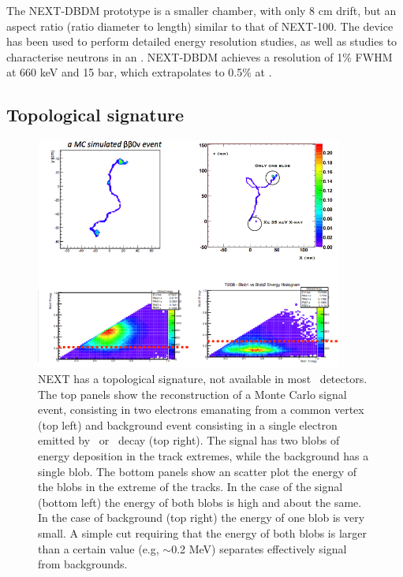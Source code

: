 The NEXT-DBDM prototype is a smaller chamber, with only 8 cm drift, but an aspect ratio (ratio diameter to length) similar to that of NEXT-100. The device has been used to perform detailed energy resolution studies, as well as studies to characterise neutrons in an \HPXE. NEXT-DBDM achieves a resolution of 1\% FWHM at 660 keV and 15 bar, which extrapolates to 0.5\% at \Qbb\cite{Alvarez:2012kua}.

\subsection{Topological signature}

\begin{figure}
\centering
\includegraphics[width=0.9\textwidth]{img2/Topo2.png}
\caption{\small NEXT has a topological signature, not available in most \bbonu\ detectors. The top panels show the reconstruction of a Monte Carlo signal event, consisting in two electrons emanating from a common vertex (top left) and background event consisting in a single electron emitted by \BI\ or \TL\ decay (top right). The signal has two blobs of energy deposition in the track extremes, while the background has a single blob. The bottom panels show an scatter plot the energy of the blobs in the extreme of the tracks. In the case of the signal (bottom left) the energy of both blobs is high and about the same. In the case of background (top right) the energy of one blob is very small.  A simple cut requiring that the energy of both blobs is larger than a certain value (e.g, $\sim$0.2 MeV) separates effectively signal from backgrounds.}\label{fig.ETRK2}
\end{figure}

